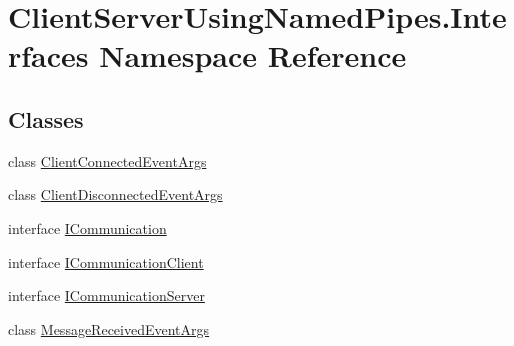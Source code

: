 \hypertarget{namespace_client_server_using_named_pipes_1_1_interfaces}{}\section{Client\+Server\+Using\+Named\+Pipes.\+Interfaces Namespace Reference}
\label{namespace_client_server_using_named_pipes_1_1_interfaces}
\subsection*{Classes}
\begin{DoxyCompactItemize}
\item 
class \hyperlink{class_client_server_using_named_pipes_1_1_interfaces_1_1_client_connected_event_args}{Client\+Connected\+Event\+Args}
\item 
class \hyperlink{class_client_server_using_named_pipes_1_1_interfaces_1_1_client_disconnected_event_args}{Client\+Disconnected\+Event\+Args}
\item 
interface \hyperlink{interface_client_server_using_named_pipes_1_1_interfaces_1_1_i_communication}{I\+Communication}
\item 
interface \hyperlink{interface_client_server_using_named_pipes_1_1_interfaces_1_1_i_communication_client}{I\+Communication\+Client}
\item 
interface \hyperlink{interface_client_server_using_named_pipes_1_1_interfaces_1_1_i_communication_server}{I\+Communication\+Server}
\item 
class \hyperlink{class_client_server_using_named_pipes_1_1_interfaces_1_1_message_received_event_args}{Message\+Received\+Event\+Args}
\end{DoxyCompactItemize}
